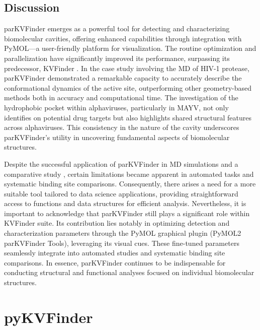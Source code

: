 \documentclass[Ingles]{phdthesis}
\begin{document}
\subsection{Discussion}

parKVFinder emerges as a powerful tool for detecting and characterizing biomolecular cavities, offering enhanced capabilities through integration with PyMOL—a user-friendly platform for visualization. The routine optimization and parallelization have significantly improved its performance, surpassing its predecessor, KVFinder \cite{guerra2019,guerra2020}. In the case study involving the \acs{MD} of HIV-1 protease, parKVFinder demonstrated a remarkable capacity to accurately describe the conformational dynamics of the active site, outperforming other geometry-based methods both in accuracy and computational time. The investigation of the hydrophobic pocket within alphaviruses, particularly in MAYV, not only identifies on potential drug targets but also highlights shared structural features across alphaviruses. This consistency in the nature of the cavity underscores parKVFinder's utility in uncovering fundamental aspects of biomolecular structures.

Despite the successful application of parKVFinder in \acs{MD} simulations \cite{guerra2020} and a comparative study \cite{ribeiro2021}, certain limitations became apparent in automated tasks and systematic binding site comparisons. Consequently, there arises a need for a more suitable tool tailored to data science applications, providing straightforward access to functions and data structures for efficient analysis. Nevertheless, it is important to acknowledge that parKVFinder still plays a significant role within KVFinder suite. Its contribution lies notably in optimizing detection and characterization parameters through the PyMOL graphical plugin (PyMOL2 parKVFinder Tools), leveraging its visual cues. These fine-tuned parameters seamlessly integrate into automated studies and systematic binding site comparisons. In essence, parKVFinder continues to be indispensable for conducting structural and functional analyses focused on individual biomolecular structures.

\section{pyKVFinder}
\end{document}
